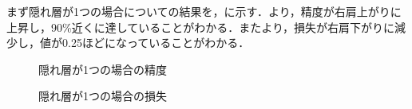 \documentclass{eithesis}
\begin{document}
  まず隠れ層が1つの場合についての結果を，に示す．より，精度が右肩上がりに上昇し，90\%近くに達していることがわかる．またより，損失が右肩下がりに減少し，値が0.25ほどになっていることがわかる．
  \begin{figure}[htbp]
    \centering
    \caption{隠れ層が1つの場合の精度}
    \label{fig_hidden1_acc}
  \end{figure}
  \begin{figure}[htbp]
    \centering
    \caption{隠れ層が1つの場合の損失}
    \label{fig_hidden1_loss}
  \end{figure}
\end{document}
